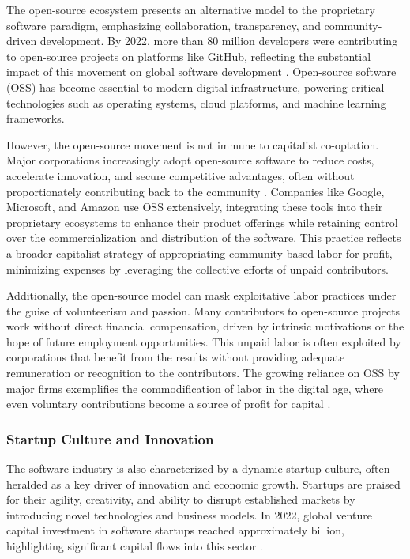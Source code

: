 \begin{refsection}
The open-source ecosystem presents an alternative model to the proprietary software paradigm, emphasizing collaboration, transparency, and community-driven development. By 2022, more than 80 million developers were contributing to open-source projects on platforms like GitHub, reflecting the substantial impact of this movement on global software development \cite[pp.~107-110]{nadia2020working}. Open-source software (OSS) has become essential to modern digital infrastructure, powering critical technologies such as operating systems, cloud platforms, and machine learning frameworks.

However, the open-source movement is not immune to capitalist co-optation. Major corporations increasingly adopt open-source software to reduce costs, accelerate innovation, and secure competitive advantages, often without proportionately contributing back to the community \cite[pp.~65-67]{weber2005success}. Companies like Google, Microsoft, and Amazon use OSS extensively, integrating these tools into their proprietary ecosystems to enhance their product offerings while retaining control over the commercialization and distribution of the software. This practice reflects a broader capitalist strategy of appropriating community-based labor for profit, minimizing expenses by leveraging the collective efforts of unpaid contributors.

Additionally, the open-source model can mask exploitative labor practices under the guise of volunteerism and passion. Many contributors to open-source projects work without direct financial compensation, driven by intrinsic motivations or the hope of future employment opportunities. This unpaid labor is often exploited by corporations that benefit from the results without providing adequate remuneration or recognition to the contributors. The growing reliance on OSS by major firms exemplifies the commodification of labor in the digital age, where even voluntary contributions become a source of profit for capital \cite[pp.~41-43]{fisher2022capitalistrealism}.

\subsubsection{Startup Culture and Innovation}

The software industry is also characterized by a dynamic startup culture, often heralded as a key driver of innovation and economic growth. Startups are praised for their agility, creativity, and ability to disrupt established markets by introducing novel technologies and business models. In 2022, global venture capital investment in software startups reached approximately  billion, highlighting significant capital flows into this sector \cite[pp.~22-25]{gompers2005venture}. 


\end{refsection}

